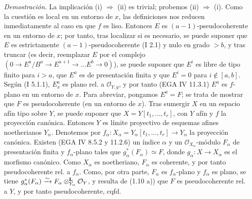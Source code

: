 \emph{Demostración.} La implicación (i) \(\Longrightarrow\) (ii) es trivial; probemos (ii) \(\Longrightarrow\) (i). Como la cuestión es local en un entorno de \(x\), las definiciones nos reducen inmediatamente al caso en que \(f\) es liso. Entonces \(E\) es \((a-1)\)-pseudocoherente en un entorno de \(x\); por tanto, tras localizar si es necesario, se puede suponer que \(E\) es estrictamente \((a-1)\)-pseudocoherente (I 2.1) y nulo en grado \(>b\), y tras truncar (es decir, reemplazar \(E\) por el complejo \((0\to E^a/B^a\to E^{a+1}\to\ldots E^b\to 0)\)), se puede suponer que \(E^i\) es libre de tipo finito para \(i>a\), que \(E^a\) es de presentación finita y que \(E^i=0\) para \(i\notin[a,b]\). Según (I 5.1.1), \(E^a_x\) es plano rel. a \(\mathcal O_{Y,y}\), y por tanto (EGA IV 11.3.1) \(E^a\) es \(f\)-plano en un entorno de \(x\). Para abreviar, pongamos \(E^a=F\); se trata de mostrar que \(F\) es pseudocoherente (en un entorno de \(x\)). Tras sumergir \(X\) en un espacio afín tipo sobre \(Y\), se puede suponer que \(X=Y[t_1,\dots,t_r]\), con \(Y\) afín y \(f\) la proyección canónica. Entonces \(Y\) es límite proyectivo de esquemas afines noetherianos \(Y_\alpha\). Denotemos por \(f_\alpha:X_\alpha=Y_\alpha[t_1,\dots,t_r]\to Y_\alpha\) la proyección canónica. Existen (EGA IV 8.5.2 y 11.2.6) un índice \(\alpha\) y un \(\mathcal O_{X_\alpha}\)-módulo \(F_\alpha\) de presentación finita y \(f_\alpha\)-plano tales que \(g_\alpha^*(F_\alpha)\simeq F\), donde \(g_\alpha:X\to X_\alpha\) es el morfismo canónico. Como \(X_\alpha\) es noetheriano, \(F_\alpha\) es coherente, y por tanto pseudocoherente rel. a \(f_\alpha\). Como, por otra parte, \(F_\alpha\) es \(f_\alpha\)-plano y \(f_\alpha\) es plano, se tiene \(\sisi{g_\alpha^*(F)}{g_\alpha^*(F_\alpha)}\xrightarrow{\sim}F_\alpha\otimes^{\mathbf L}_{Y_\alpha}\mathcal O_Y\), y resulta de (1.10 a)) que \(F\) es pseudocoherente rel. a \(Y\), y por tanto pseudocoherente, cqfd.
